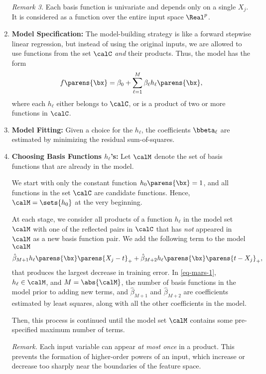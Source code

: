 \documentclass[12pt]{article}
\begin{document}
\begin{enumerate}[label=\textbf{\arabic*.}]
	\textit{Remark 3.} Each basis function is univariate and depends only on a single $X_j$. It is considered as a function over the entire input space $\Real^p$. 
	
	\item \textbf{Model Specification:} The model-building strategy is like a forward stepwise linear regression, but instead of using the original inputs, we are allowed to use functions from the set $\calC$ \emph{and} their products. Thus, the model has the form 
	\begin{align}\label{eq-mars-model}
		f \parens{\bx} = \beta_0 + \sum_{\ell=1}^M \beta_{\ell} h_{\ell} \parens{\bx}, 
	\end{align}
	where each $h_{\ell}$ either belongs to $\calC$, or is a product of two or more functions in $\calC$. 
	
	\item \textbf{Model Fitting:} Given a choice for the $h_{\ell}$, the coefficients $\bbeta_{\ell}$ are estimated by minimizing the residual sum-of-squares. 
	
	\item \textbf{Choosing Basis Functions $h_{\ell}$'s:} Let $\calM$ denote the set of basis functions that are already in the model. 
	
	We start with only the constant function $h_0 \parens{\bx} = 1$, and all functions in the set $\calC$ are candidate functions. Hence, $\calM = \sets{h_0}$ at the very beginning. 
	
	At each stage, we consider all products of a function $h_{\ell}$ in the model set $\calM$ with one of the reflected pairs in $\calC$ that has \emph{not} appeared in $\calM$ as a new basis function pair. We add the following term to the model $\calM$ 
	\begin{align}\label{eq-mars-1}
		\hat{\beta}_{M+1} h_{\ell} \parens{\bx} \parens{X_j - t}_+ + \hat{\beta}_{M+2} h_{\ell} \parens{\bx} \parens{t - X_j}_+, 
	\end{align}
	that produces the largest decrease in training error. In \eqref{eq-mars-1}, $h_{\ell} \in \calM$, and $M = \abs{\calM}$, the number of basis functions in the model prior to adding new terms, and $\hat{\beta}_{M+1}$ and $\hat{\beta}_{M+2}$ are coefficients estimated by least squares, along with all the other coefficients in the model. 
	
	Then, this process is continued until the model set $\calM$ contains some pre-specified maximum number of terms. 
	
	\textit{Remark.} Each input variable can appear \emph{at most once} in a product. This prevents the formation of higher-order powers of an input, which increase or decrease too sharply near the boundaries of the feature space. 
	

\end{enumerate}
\end{document}
